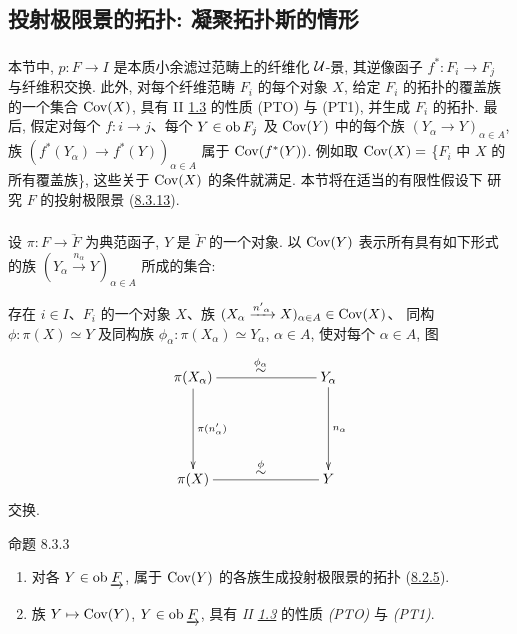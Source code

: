 

\subsection{投射极限景的拓扑: 凝聚拓扑斯的情形}

\subsubsection{}

本节中, $p:F\to I$ 是本质小余滤过范畴上的纤维化 ${\mathcal U}$-景,
其逆像函子 $f^{\ast}:F_i\to F_j$ 与纤维积交换.
此外, 对每个纤维范畴 $F_i$ 的每个对象 $X$,
给定 $F_i$ 的拓扑的覆盖族的一个集合 $\operatorname{Cov}(X)$,
具有 II \hyperref[II.def1.3]{1.3} 的性质 (PTO) 与 (PT1),
并生成 $F_i$ 的拓扑.
最后, 假定对每个 $f:i\to j$、每个 $Y\in\operatorname{ob} F_j$
及 $\operatorname{Cov}(Y)$ 中的每个族 $(Y_{\alpha}\to Y)_{\alpha\in A}$,
族 $(f^{\ast}(Y_{\alpha})\to f^{\ast}(Y))_{\alpha\in A}$
属于 $\operatorname{Cov}(f^{\ast}(Y))$.
例如取 $\operatorname{Cov}(X)=$ \{$F_i$ 中 $X$ 的所有覆盖族\},
这些关于 $\operatorname{Cov}(X)$ 的条件就满足.
本节\pageoriginale{}将在适当的有限性假设下
研究 $F$ 的投射极限景
(\hyperref[VI.thm8.3.13]{8.3.13}).

\subsubsection{}

设 $\pi:F\to\underrightarrow{F}$ 为典范函子,
$Y$ 是 $\underrightarrow{F}$ 的一个对象.
以 $\operatorname{Cov}(Y)$ 表示所有具有如下形式的族
$(Y_{\alpha}\xrightarrow{n_{\alpha}}Y)_{\alpha\in A}$ 所成的集合:

存在 $i\in I$、$F_i$ 的一个对象 $X$、族
$(X_{\alpha}\xrightarrow{{n'}_\alpha}X)_{\alpha\in A}\in\operatorname{Cov}(X)$、
同构 $\phi:\pi(X)\simeq Y$
及同构族 $\phi_{\alpha}:\pi(X_{\alpha})\simeq Y_{\alpha}$,
$\alpha\in A$,
使对每个 $\alpha\in A$, 图
\[
\xymatrix@C=2.5cm@R=2cm{
\pi(X_{\alpha})
\ar@{-}[r]^{\displaystyle{\mathop{\sim}^{\phi_{\alpha}}}} \ar[d]^{\pi(n'_{\alpha})}& Y_{\alpha}\ar[d]^{n_{\alpha}} \\
\pi(X)  \ar@{-}[r]^{\displaystyle{\mathop{\sim}^{\phi}}} & Y
}
\]
交换.

\begin{enonce*}{命题 8.3.3}
\begin{enumerate}
\renewcommand{\labelenumi}{\theenumi)}
\item 对各 $Y\in\operatorname{ob}\underrightarrow{F}$,
属于 $\operatorname{Cov}(Y)$ 的各族生成投射极限景的拓扑
(\hyperref[VI.def8.2.5]{8.2.5}).

\item 族 $Y\mapsto\operatorname{Cov}(Y)$, $Y\in\operatorname{ob}\underrightarrow{F}$,
具有 \emph{II \hyperref[II.def1.3]{1.3}}
的性质 \emph{(PTO)} 与 \emph{(PT1)}.
\end{enumerate}
\end{enonce*}

